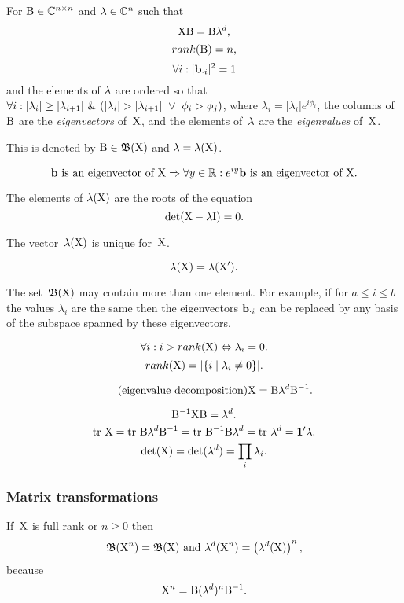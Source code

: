 \documentclass[10pt,a4paper]{article}
\theoremstyle{plain} \newtheorem{Lem}{Lemma}
\begin{document}
{
For $\mathrm B \in \mathbb C^{n \times n}$ and $\mathbf \lambda \in \mathbb C^n$
such that
$$\mathrm X \mathrm B = \mathrm B \mathbf \lambda^d,$$
$$ rank(\mathrm B) = n, $$
$$ \forall i: |\mathbf b_{\cdot i}|^2 = 1 $$
and the elements of $\mathbf \lambda$ are ordered so that $\forall i : |\lambda_i| \ge |\lambda_{i+1}| \ \& \  (|\lambda_i| > |\lambda_{i+1}| \ \vee \  \phi_i > \phi_j)$, where $\lambda_i = |\lambda_i| e^{i \phi_i}$,
the columns of~$\mathrm B$ are the {\em eigenvectors} of~$\mathrm X$,
and the elements of~$\mathbf \lambda$ are the {\em eigenvalues} of~$\mathrm X$.

This is denoted by $\mathrm B \in \mathfrak B(\mathrm X)$ and $\mathbf \lambda = \mathbf \lambda(\mathrm X)$.
}

$$ \mathbf b \text{ is an eigenvector of } \mathrm X \Rightarrow \forall y \in \mathbb R : e^{i y} \mathbf b \text{ is an eigenvector of } \mathrm X. $$

The elements of $\mathbf \lambda(\mathrm X)$ are the roots of the equation
$$ \det(\mathrm X - \lambda \mathrm I) = 0. $$

The vector~$\mathbf \lambda(\mathrm X)$ is unique for~$\mathrm X$.

$$ \mathbf \lambda(\mathrm X) = \mathbf \lambda(\mathrm X'). $$

The set~$\mathfrak B(\mathrm X)$ may contain more than one element.
For example, if for $a \le i \le b$ the values $\lambda_i$ are the same
then the eigenvectors $\mathbf b_{\cdot i}$ can be replaced by any basis of the subspace spanned by these eigenvectors.

$$ \forall i: i > rank(\mathrm X) \Leftrightarrow \lambda_i = 0. $$
$$ rank(\mathrm X) = |\{i \mid \lambda_i \ne 0\}|. $$

\begin{equation} \label{mat2eigen} \tag{eigenvalue decomposition}
  \mathrm X = \mathrm B \mathbf \lambda^d \mathrm B^{-1}.
\end{equation}

$$ \mathrm B^{-1} \mathrm X \mathrm B = \mathbf \lambda^d. $$
$$ \mathrm {tr} \  \mathrm X = \mathrm {tr} \  \mathrm B \mathbf \lambda^d \mathrm B^{-1} = \mathrm {tr} \  \mathrm B^{-1} \mathrm B \mathbf \lambda^d = \mathrm {tr} \  \mathbf \lambda^d = \mathbf 1' \mathbf \lambda. $$
$$ \det(\mathrm X) = \det(\mathbf \lambda^d) = \prod_i \lambda_i. $$


\subsubsection {Matrix transformations}
If~$\mathrm X$ is full rank or $n \ge 0$ then
$$ \mathfrak B(\mathrm X^n)  = \mathfrak B(\mathrm X) \text{ and } \mathbf \lambda^d(\mathrm X^n) = \left(\mathbf \lambda^d(\mathrm X) \right)^n, $$
because
$$ \mathrm X^n = \mathrm B (\mathbf \lambda^d)^n \mathrm B^{-1}. $$
\end{document}

